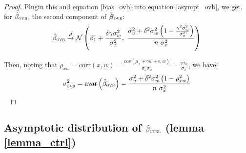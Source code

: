 \documentclass[usletter, 12pt]{article}
\begin{document}
\begin{proof}
				Plugin this and equation \ref{bias_ovb} into equation \ref{asympt_ovb}, we get, for $\hat{\beta}_{\textsc{ovb}}$, the second component of $\hat{\bm{\beta}}_{\textsc{ovb}}$:
				~
				\begin{equation*}
						\hat{\beta}_{\textsc{ovb}} \overset{d}{\to} \mathcal{N}\left( \beta_1 + \dfrac{\delta \gamma \sigma_{w}^{2}}{\sigma_{x}^{2}}, \ \dfrac{ \sigma_{u}^{2} +  \delta^{2} \sigma_{w}^{2} \left(1 - \frac{\gamma^{2}\sigma_{w}^{2}}{\sigma_{x}^{2}} \right)}{n \ \sigma_{x}^{2}} \right) 
				\end{equation*}
				
				Then, noting that $\rho_{xw} =  \text{corr}(x, w) = \frac{ \text{cov}(\mu_{x} + \gamma w + \epsilon, w)}{\sigma_{x}\sigma_{w}} = \frac{\gamma\sigma_{w}}{\sigma_{x}}$, we have:
				\[
					\sigma_{\textsc{ovb}}^{2} = \text{avar}\left(\hat{\beta}_{\textsc{ovb}}\right) = \dfrac{ \sigma_{u}^{2} +  \delta^{2} \sigma_{w}^{2} \left(1 - \rho_{xw}^{2} \right)}{n \ \sigma_{x}^{2}}
				\]
				~
			\end{proof}

	

\subsection{Asymptotic distribution of $\hat{\beta}_{\textsc{ctrl}}$ (lemma \ref{lemma_ctrl})}
	
\end{document}
